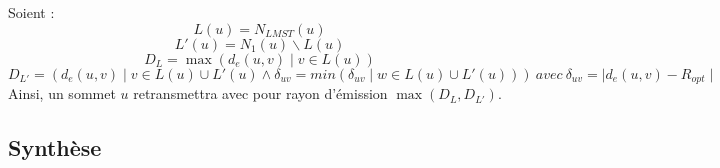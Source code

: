 Soient : 
$$L(u)= N_{LMST}(u)$$
$$L'(u)=N_1(u)\backslash L(u)$$
$$D_L=\max(d_e(u,v)\mid v \in L(u))$$
$$D_{L'}=(d_e(u,v)\mid v \in L(u)\cup L'(u)\wedge \delta_{uv}=min(\delta_{uv}\mid w \in L(u)\cup L'(u)))\ avec\ \delta_{uv}=\mid d_e(u,v)-R_{opt}\mid$$
Ainsi, un sommet $u$ retransmettra avec pour rayon d'émission $\max(D_L,D_{L'})$.







\subsection{Synthèse}


